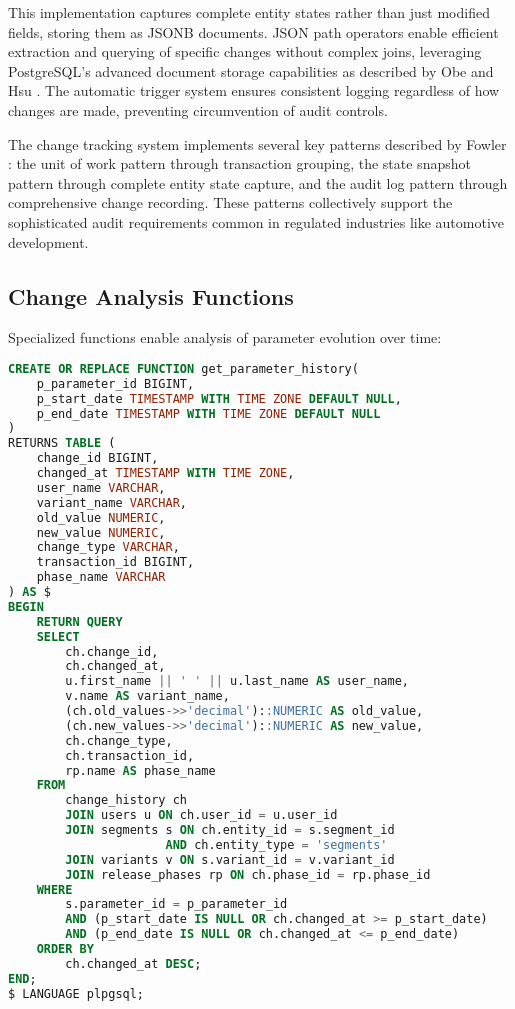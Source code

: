 This implementation captures complete entity states rather than just modified fields, storing them as JSONB documents. JSON path operators enable efficient extraction and querying of specific changes without complex joins, leveraging PostgreSQL's advanced document storage capabilities as described by Obe and Hsu \cite{obe2017postgresql}. The automatic trigger system ensures consistent logging regardless of how changes are made, preventing circumvention of audit controls.

The change tracking system implements several key patterns described by Fowler \cite{fowler2003patterns}: the unit of work pattern through transaction grouping, the state snapshot pattern through complete entity state capture, and the audit log pattern through comprehensive change recording. These patterns collectively support the sophisticated audit requirements common in regulated industries like automotive development.

\subsection{Change Analysis Functions}
\label{subsec:change-analysis-functions}

Specialized functions enable analysis of parameter evolution over time:

\begin{lstlisting}[language=SQL, caption={Parameter History Function}, label={lst:parameter-history}]
CREATE OR REPLACE FUNCTION get_parameter_history(
    p_parameter_id BIGINT,
    p_start_date TIMESTAMP WITH TIME ZONE DEFAULT NULL,
    p_end_date TIMESTAMP WITH TIME ZONE DEFAULT NULL
)
RETURNS TABLE (
    change_id BIGINT,
    changed_at TIMESTAMP WITH TIME ZONE,
    user_name VARCHAR,
    variant_name VARCHAR,
    old_value NUMERIC,
    new_value NUMERIC,
    change_type VARCHAR,
    transaction_id BIGINT,
    phase_name VARCHAR
) AS $
BEGIN
    RETURN QUERY
    SELECT 
        ch.change_id,
        ch.changed_at,
        u.first_name || ' ' || u.last_name AS user_name,
        v.name AS variant_name,
        (ch.old_values->>'decimal')::NUMERIC AS old_value,
        (ch.new_values->>'decimal')::NUMERIC AS new_value,
        ch.change_type,
        ch.transaction_id,
        rp.name AS phase_name
    FROM 
        change_history ch
        JOIN users u ON ch.user_id = u.user_id
        JOIN segments s ON ch.entity_id = s.segment_id 
                      AND ch.entity_type = 'segments'
        JOIN variants v ON s.variant_id = v.variant_id
        JOIN release_phases rp ON ch.phase_id = rp.phase_id
    WHERE 
        s.parameter_id = p_parameter_id
        AND (p_start_date IS NULL OR ch.changed_at >= p_start_date)
        AND (p_end_date IS NULL OR ch.changed_at <= p_end_date)
    ORDER BY 
        ch.changed_at DESC;
END;
$ LANGUAGE plpgsql;
\end{lstlisting}

